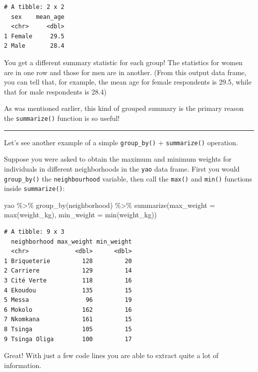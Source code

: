 \documentclass[
  letterpaper,
  DIV=11,
  numbers=noendperiod]{scrreprt}
\newenvironment{Shaded}{\begin{snugshade}}{\end{snugshade}}
\newcommand{\AttributeTok}[1]{\textcolor[rgb]{0.40,0.45,0.13}{#1}}
\newcommand{\FunctionTok}[1]{\textcolor[rgb]{0.28,0.35,0.67}{#1}}
\newcommand{\NormalTok}[1]{\textcolor[rgb]{0.00,0.23,0.31}{#1}}
\newcommand{\SpecialCharTok}[1]{\textcolor[rgb]{0.37,0.37,0.37}{#1}}
\begin{document}
\begin{verbatim}
# A tibble: 2 x 2
  sex    mean_age
  <chr>     <dbl>
1 Female     29.5
2 Male       28.4
\end{verbatim}

You get a different summary statistic for each group! The statistics for
women are in one row and those for men are in another. (From this output
data frame, you can tell that, for example, the mean age for female
respondents is 29.5, while that for male respondents is 28.4)

As was mentioned earlier, this kind of grouped summary is the primary
reason the \texttt{summarize()} function is so useful!

\begin{center}\rule{0.5\linewidth}{0.5pt}\end{center}

Let's see another example of a simple \texttt{group\_by()} +
\texttt{summarize()} operation.

Suppose you were asked to obtain the maximum and minimum weights for
individuals in different neighborhoods in the \texttt{yao} data frame.
First you would \texttt{group\_by()} the \texttt{neighbourhood}
variable, then call the \texttt{max()} and \texttt{min()} functions
inside \texttt{summarize()}:

\begin{Shaded}
\begin{Highlighting}[]
\NormalTok{yao }\SpecialCharTok{\%\textgreater{}\%} 
  \FunctionTok{group\_by}\NormalTok{(neighborhood) }\SpecialCharTok{\%\textgreater{}\%} 
  \FunctionTok{summarize}\NormalTok{(}\AttributeTok{max\_weight =} \FunctionTok{max}\NormalTok{(weight\_kg), }
            \AttributeTok{min\_weight =} \FunctionTok{min}\NormalTok{(weight\_kg))}
\end{Highlighting}
\end{Shaded}

\begin{verbatim}
# A tibble: 9 x 3
  neighborhood max_weight min_weight
  <chr>             <dbl>      <dbl>
1 Briqueterie         128         20
2 Carriere            129         14
3 Cité Verte          118         16
4 Ekoudou             135         15
5 Messa                96         19
6 Mokolo              162         16
7 Nkomkana            161         15
8 Tsinga              105         15
9 Tsinga Oliga        100         17
\end{verbatim}

Great! With just a few code lines you are able to extract quite a lot of
information.
\end{document}
